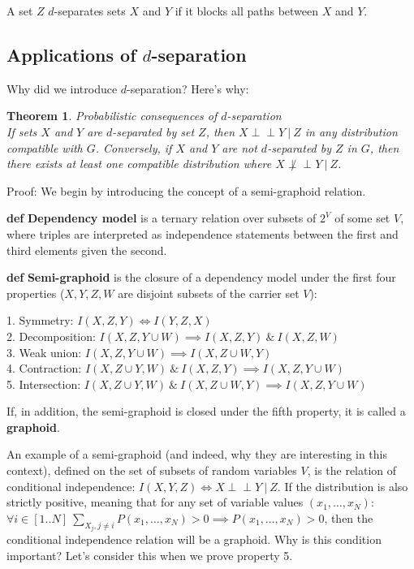 \documentclass[fleqn]{article}
\newcommand{\independent}{\perp \!\!\! \perp}
\def\define#1{\textbf{def} \textbf{#1}}
\newtheorem{theorem}{Theorem}
\numberwithin{equation}{section}
\numberwithin{theorem}{section}
\numberwithin{figure}{section}
\numberwithin{lemma}{section}
\numberwithin{corollary}{section}
\begin{document}
	A set $Z$ $d$-separates sets $X$ and $Y$ if it blocks all paths between $X$ and $Y$.
	
	\subsection*{Applications of $d$-separation}
	
	Why did we introduce $d$-separation? Here's why:
	
	\begin{theorem} Probabilistic consequences of $d$-separation\\
		If sets $X$ and $Y$ are $d$-separated by set $Z$, then $X \independent Y\ |\ Z$ in any distribution compatible with $G$. Conversely, if $X$ and $Y$ are not $d$-separated by $Z$ in $G$, then there exists at least one compatible distribution where $X \not \independent Y \ | \ Z$.
		\label{th:th1}
	\end{theorem}
	
	Proof: We begin by introducing the concept of a semi-graphoid relation.
	
	\vspace{0.2cm}
	
	\define{Dependency model} is a ternary relation over subsets of $2^V$ of some set $V$, where triples are interpreted as independence statements between the first and third elements given the second.
	
	\define{Semi-graphoid} is the closure of a dependency model under the first four properties ($X, Y, Z, W$ are disjoint subsets of the carrier set $V$):
	\begin{tcolorbox}
		1. Symmetry: $I(X, Z, Y) \iff I(Y, Z, X)$ \\
		2. Decomposition: $I(X, Z, Y\cup W) \implies I(X, Z, Y)\ \&\ I(X, Z, W)$\\
		3. Weak union: $I(X, Z, Y\cup W) \implies I(X, Z \cup W, Y)$\\
		4. Contraction: $I(X, Z\cup Y, W)\ \&\ I(X, Z, Y) \implies I(X, Z, Y\cup W)$\\
		5. Intersection: $I(X, Z\cup Y, W)\ \&\ I(X, Z\cup W, Y) \implies I(X, Z, Y\cup W)$
	\end{tcolorbox}
	
If, in addition, the semi-graphoid is closed under the fifth property, it is called a \textbf{graphoid}.

An example of a semi-graphoid (and indeed, why they are interesting in this context), defined on the set of subsets of random variables \( V \), is the relation of conditional independence: \( I(X,Y,Z) \iff X \independent Y\ |\ Z \). If the distribution is also strictly positive, meaning that for any set of variable values \((x_1, \ldots, x_N)\): \(\forall i \in [1..N]\ \sum_{X_j, j \neq i} P(x_1, \ldots, x_N) > 0 \implies P(x_1, \ldots, x_N) > 0\), then the conditional independence relation will be a graphoid. Why is this condition important? Let's consider this when we prove property 5.
\end{document}
